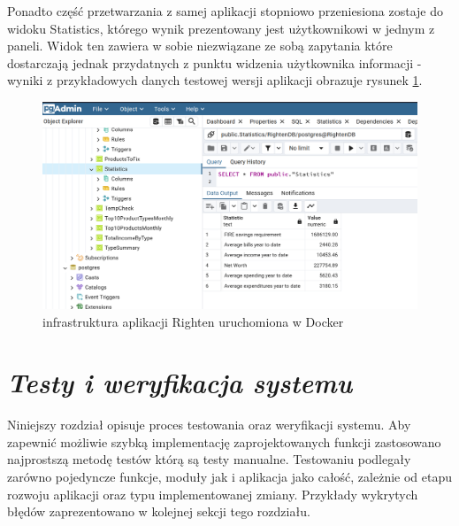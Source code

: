 \documentclass[a4paper, 10pt, twoside, openright]{report}
\newcommand{\customstylechapter}[1]{\large{\textit{#1}}}
\begin{document}
\begin{large}
{Ponadto część przetwarzania z samej aplikacji stopniowo przeniesiona zostaje do
 widoku Statistics, którego wynik prezentowany jest użytkownikowi w jednym z 
paneli. Widok ten zawiera w sobie niezwiązane ze sobą zapytania które 
dostarczają jednak przydatnych z punktu widzenia użytkownika informacji - 
wyniki z przykładowych danych testowej wersji aplikacji obrazuje rysunek 
\ref*{fig:dbwidoki-statistics}.}

\begin{figure}[H]           %
    \centering
    \includegraphics[width=12cm]{figures/RightenDB_views_statistics.png}
    \caption{infrastruktura aplikacji Righten uruchomiona w Docker}
    \label{fig:dbwidoki-statistics}
\end{figure}

\chapter{\customstylechapter{Testy i weryfikacja systemu}}
{Niniejszy rozdział opisuje proces testowania oraz weryfikacji systemu. Aby 
zapewnić możliwie szybką implementację zaprojektowanych funkcji zastosowano 
najprostszą metodę testów którą są testy manualne. Testowaniu podlegały zarówno pojedyncze funkcje, moduły jak i aplikacja jako 
całość, zależnie od etapu rozwoju aplikacji oraz typu implementowanej zmiany. 
Przykłady wykrytych błędów zaprezentowano w kolejnej sekcji tego rozdziału.}


\end{large}
\end{document}
